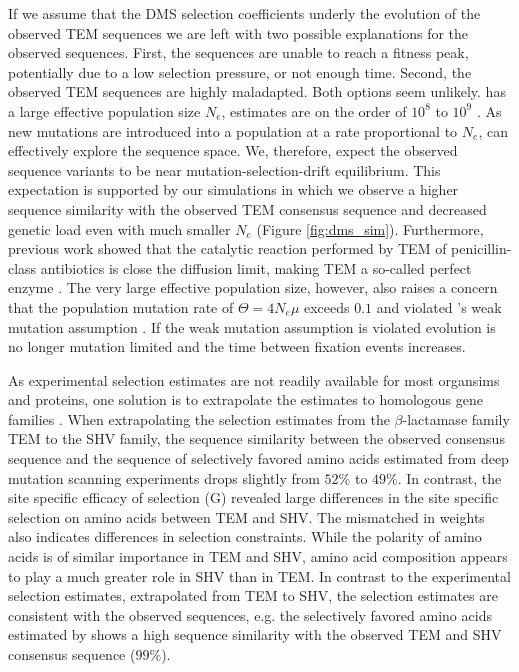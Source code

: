 
If we assume that the DMS selection coefficients underly the evolution of the observed TEM sequences we are left with two possible explanations for the observed sequences.
First, the sequences are unable to reach a fitness peak, potentially due to a low selection pressure, or not enough time.
Second, the observed TEM sequences are highly maladapted.
Both options seem unlikely.
\ecoli has a large effective population size $N_e$, estimates are on the order of $10^8$ to $10^9$ \citep{OchmanAndWilson1987, hartl1994}.
As new mutations are introduced into a population at a rate proportional to $N_e$, \ecoli can effectively explore the sequence space.
We, therefore, expect the observed sequence variants to be near mutation-selection-drift equilibrium.
This expectation is supported by our simulations in which we observe a higher sequence similarity with the observed TEM consensus sequence and decreased genetic load even with much smaller $N_e$ (Figure \ref{fig:dms_sim}).
Furthermore, previous work showed that the catalytic reaction performed by TEM of penicillin-class antibiotics is close the diffusion limit, making TEM a so-called perfect enzyme \citep{matagne1998}.
The very large effective population size, however, also raises a concern that the population mutation rate of \ecoli $\Theta = 4N_e\mu$ exceeds $0.1$ and violated \selac's weak mutation assumption \citep{deKoning259507}.
If the weak mutation assumption is violated evolution is no longer mutation limited and the time between fixation events increases.

As experimental selection estimates are not readily available for most organsims and proteins, one solution is to extrapolate the estimates to homologous gene families \citep{bloom2014, bloom2017}.
When extrapolating the selection estimates from the $\beta$-lactamase family TEM to the SHV family, the sequence similarity between the observed consensus sequence and the sequence of selectively favored amino acids estimated from deep mutation scanning experiments drops slightly from $52 \% $ to $49 \%$.
In contrast, the site specific efficacy of selection (G) revealed large differences in the site specific selection on amino acids between TEM and SHV.
The mismatched in \PC weights also indicates differences in selection constraints. 
While the polarity of amino acids is of similar importance in TEM and SHV, amino acid composition appears to play a much greater role in SHV than in TEM.
In contrast to the experimental selection estimates, extrapolated from TEM to SHV, the \selac selection estimates are consistent with the observed sequences, e.g. the selectively favored amino acids estimated by \selac shows a high sequence similarity with the observed TEM and SHV consensus sequence ($99 \%$).

